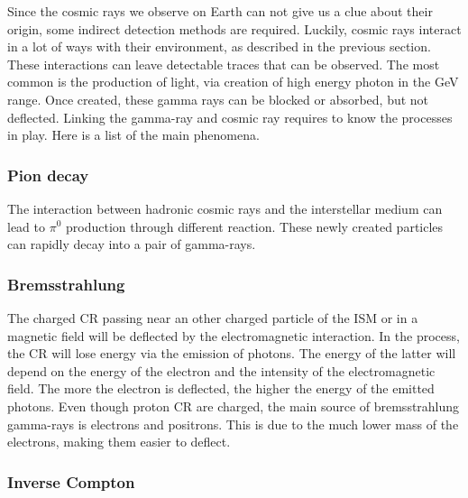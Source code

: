 Since the cosmic rays we observe on Earth can not give us a clue about their origin, some indirect detection methods are required. Luckily, cosmic rays interact in a lot of ways with their environment, as described in the previous section. These interactions can leave detectable traces that can be observed. The most common is the production of light, via creation of high energy photon in the GeV range. Once created, these gamma rays can be blocked or absorbed, but not deflected. Linking the gamma-ray and cosmic ray requires to know the processes in play. Here is a list of the main phenomena.

\subsubsection{Pion decay}


The interaction between hadronic cosmic rays and the interstellar medium can lead to $\pi^0$ production through different reaction. These newly created  particles can rapidly decay into a pair of gamma-rays.



\subsubsection{Bremsstrahlung}


The charged CR passing near an other charged particle of the ISM or in a magnetic field will be deflected by the electromagnetic interaction. In the process, the CR will lose energy via the emission of photons. The energy of the latter will depend on the energy of the electron and the intensity of the electromagnetic field. The more the electron is deflected, the higher the energy of the emitted photons.
Even though proton CR are charged, the main source of bremsstrahlung gamma-rays is electrons and positrons. This is due to the much lower mass of the electrons, making them easier to deflect.



\subsubsection{Inverse Compton}


